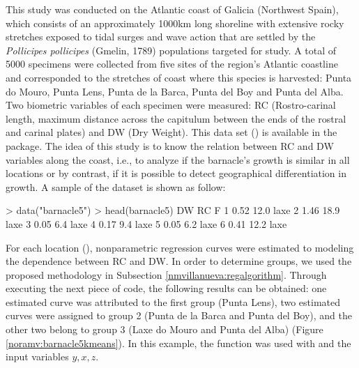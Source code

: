 This study was conducted on the Atlantic coast of Galicia (Northwest Spain), which consists of an approximately 1000km long shoreline with extensive rocky stretches exposed to tidal surges and wave action that are settled by the \textit{Pollicipes pollicipes} (Gmelin, 1789) populations targeted for study. A total of 5000 specimens were collected from five sites of the region's Atlantic coastline and corresponded to the stretches of coast where this species is harvested: Punta do Mouro, Punta Lens, Punta de la Barca, Punta del Boy and Punta del Alba. Two biometric variables of each specimen were measured: RC (Rostro-carinal length, maximum distance across the capitulum between the ends of the rostral and carinal plates) and  DW (Dry Weight). This data set () is available in the  package. The idea of this study is to know the relation between RC and DW variables along the coast, i.e., to analyze if  the barnacle's growth is similar in all locations  or by contrast, if it is possible to detect geographical differentiation in growth.
A sample of the dataset is shown as follow:

\begin{example}
> data("barnacle5")
> head(barnacle5)
    DW   RC    F
1 0.52 12.0 laxe
2 1.46 18.9 laxe
3 0.05  6.4 laxe
4 0.17  9.4 laxe
5 0.05  6.2 laxe
6 0.41 12.2 laxe
\end{example}
 
\newpage

For each location (), nonparametric regression curves were estimated to modeling the dependence between RC and DW. In order to determine groups, we used the proposed methodology in Subsection \ref{nmvillanueva:regalgorithm}. Through executing the next piece of code, the following results can be obtained: one estimated  curve was attributed to the first group (Punta Lens), two estimated curves were assigned to  group 2 (Punta de la Barca and Punta del Boy), and the other two belong to  group 3 (Laxe do Mouro and Punta del Alba) (Figure \ref{noramv:barnacle5kmeans}). In this example, the  function was used with   and the input variables $y, x, z$.

